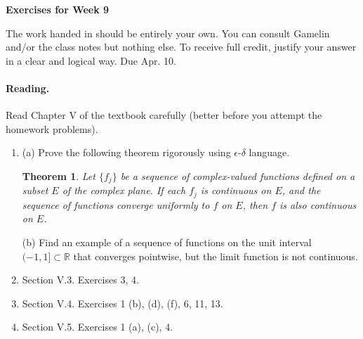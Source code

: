 \documentclass[11pt]{article}
\theoremstyle{plain}
\newtheorem{thm}{Theorem}
\theoremstyle{definition}
\def\R{\mathbb R}
\begin{document}
\begin{center}
{\Large \bf Exercises for Week 9}
\end{center}
The work handed in should be entirely your own. You can consult Gamelin and/or the class notes but nothing else. To receive full credit, justify your answer in a clear and logical way. Due Apr. 10.

\paragraph{Reading.} Read Chapter V of the textbook carefully (better before you attempt the homework problems).
\begin{enumerate}

\item (a) Prove the following theorem rigorously using $\epsilon$-$\delta$ language.

\begin{thm}Let $\{f_j\}$ be a sequence of complex-valued functions defined on a subset $E$ of the complex plane. If each $f_j$ is continuous on $E$, and the sequence of functions converge uniformly to $f$ on $E$, then $f$ is also continuous on $E$.
\end{thm}

(b) Find an example of a sequence of functions on the unit interval $(-1,1]\subset \R$ that converges pointwise, but the limit function is not continuous.

\item Section V.3. Exercises 3, 4.

\item Section V.4. Exercises 1 (b), (d), (f), 6, 11, 13.

\item Section V.5. Exercises 1 (a), (c), 4.

\end{enumerate}
\end{document}
